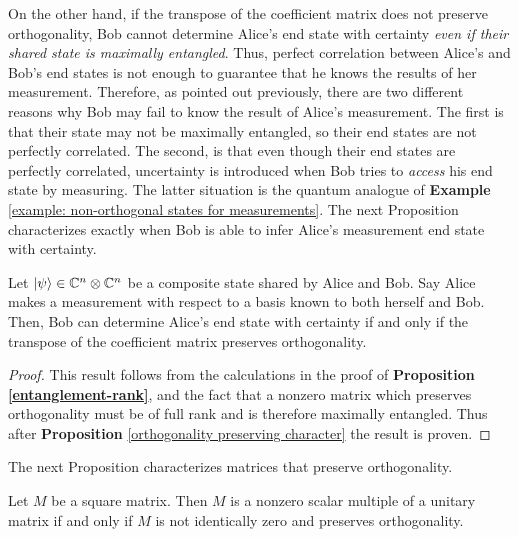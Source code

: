 On the other hand, if the transpose of the coefficient matrix does not preserve orthogonality, Bob cannot determine Alice's end state with certainty {\emph{even if their shared state is maximally entangled}}.  Thus, perfect correlation between Alice's and Bob's end states is not enough to guarantee that he knows the results of her measurement.  Therefore, as pointed out previously, there are two different reasons why  Bob may fail to know the result of Alice's measurement.  The first is that their state may not be maximally entangled, so their end states are not perfectly correlated.  The second, is that even though their end states are perfectly correlated, uncertainty is introduced when Bob tries to {\emph{access}} his end state by measuring.  The latter situation is the quantum analogue of {\bf{Example}} \ref{example: non-orthogonal states for measurements}.  The next Proposition characterizes exactly when Bob is able to infer Alice's measurement end state with certainty.

\begin{prop} \label{prop: ultimate}
Let $\ket{\psi} \in \mathbb{C}^n \otimes \mathbb{C}^{n}$ be a composite state shared by Alice and Bob. Say Alice makes a measurement with respect to a basis known to both herself and Bob.  Then, Bob can determine Alice's end state with certainty if and only if the transpose of the coefficient matrix preserves orthogonality.
\end{prop}

\begin{proof}
This result follows from the calculations in the proof of \textbf{Proposition \ref{entanglement-rank}}, and the fact that a nonzero matrix which preserves orthogonality must be of full rank and is therefore maximally entangled.  Thus after {\bf{Proposition}} \ref{orthogonality preserving character} the result is proven.
\end{proof}
The next Proposition characterizes matrices that preserve orthogonality.



\begin{prop} \label{orthogonality preserving character}
Let $M$ be a square matrix.  Then $M$ is a nonzero scalar multiple of a unitary matrix if and only if $M$ is not identically zero and preserves orthogonality.

\end{prop}

